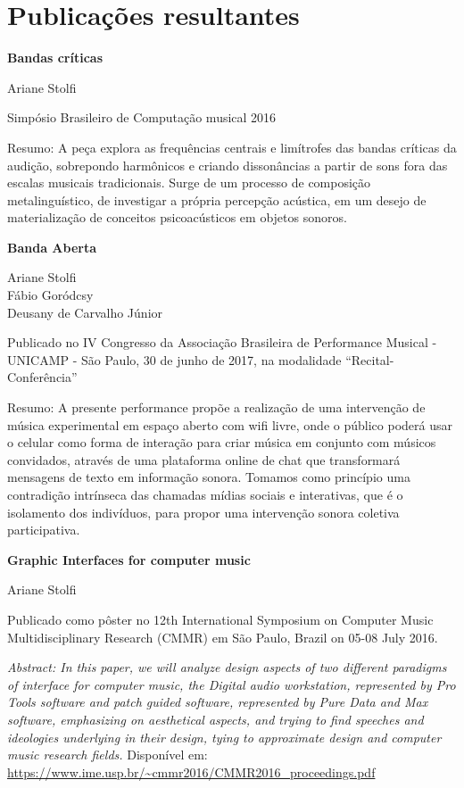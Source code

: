 \chapter{Publicações resultantes}
\label{ch:publicacoes}



\textbf{Bandas críticas}

Ariane Stolfi

Simpósio Brasileiro de Computação musical 2016

Resumo: A peça explora as frequências centrais e limítrofes das bandas críticas da audição, sobrepondo
harmônicos e criando dissonâncias a partir de sons fora das escalas musicais tradicionais. Surge de um
processo de composição metalinguístico, de investigar a própria percepção acústica, em um desejo de
materialização de conceitos psicoacústicos em objetos sonoros.

\textbf{Banda Aberta}

Ariane Stolfi\\  
Fábio Goródcsy\\
Deusany de Carvalho Júnior

Publicado no  IV Congresso da Associação Brasileira de Performance Musical - UNICAMP - São Paulo, 30 de junho de 2017, na modalidade ``Recital-Conferência''

Resumo: A presente performance propõe a realização de uma intervenção de música experimental em espaço aberto com wifi livre, onde o público poderá usar o celular como forma de interação para criar música em conjunto com músicos convidados, através de uma plataforma online de chat que transformará mensagens de texto em informação sonora. Tomamos como princípio uma contradição intrínseca das chamadas mídias sociais e interativas, que é o isolamento dos indivíduos, para propor uma intervenção sonora coletiva participativa.

\textbf{Graphic Interfaces for computer music}

Ariane Stolfi

Publicado como pôster no 12th International Symposium on Computer Music Multidisciplinary Research (CMMR) em São Paulo, Brazil on 05-08 July 2016.

\textit{Abstract: In this paper, we will analyze design aspects of two different paradigms of interface for computer music, the Digital audio workstation, represented by Pro Tools software and patch guided software, represented by Pure Data and Max software, emphasizing on aesthetical aspects, and trying to find speeches and ideologies underlying in their design, tying to approximate design and computer music research fields.}
Disponível em: \url{https://www.ime.usp.br/~cmmr2016/CMMR2016_proceedings.pdf}        

